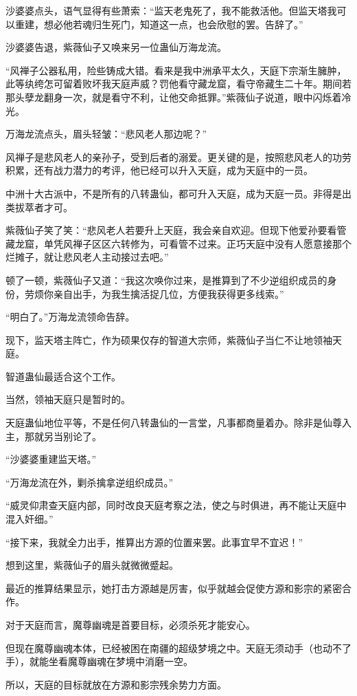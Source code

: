 \begin{this_body}
沙婆婆点头，语气显得有些萧索：“监天老鬼死了，我不能救活他。但监天塔我可以重建，想必他若魂归生死门，知道这一点，也会欣慰的罢。告辞了。”

沙婆婆告退，紫薇仙子又唤来另一位蛊仙万海龙流。

“风禅子公器私用，险些铸成大错。看来是我中洲承平太久，天庭下宗渐生臃肿，此等纨绔怎可留着败坏我天庭声威？罚他看守藏龙窟，看守帝藏生二十年。期间若那头孽龙翻身一次，就是看守不利，让他交命抵罪。”紫薇仙子说道，眼中闪烁着冷光。

万海龙流点头，眉头轻皱：“悲风老人那边呢？”

风禅子是悲风老人的亲孙子，受到后者的溺爱。更关键的是，按照悲风老人的功劳积累，还有战力潜力的考评，他已经可以升入天庭，成为天庭中的一员。

中洲十大古派中，不是所有的八转蛊仙，都可升入天庭，成为天庭一员。非得是出类拔萃者才可。

紫薇仙子笑了笑：“悲风老人若要升上天庭，我会亲自欢迎。但现下他爱孙要看管藏龙窟，单凭风禅子区区六转修为，可看管不过来。正巧天庭中没有人愿意接那个烂摊子，就让悲风老人主动接过去吧。”

顿了一顿，紫薇仙子又道：“我这次唤你过来，是推算到了不少逆组织成员的身份，劳烦你亲自出手，为我生擒活捉几位，方便我获得更多线索。”

“明白了。”万海龙流领命告辞。

现下，监天塔主阵亡，作为硕果仅存的智道大宗师，紫薇仙子当仁不让地领袖天庭。

智道蛊仙最适合这个工作。

当然，领袖天庭只是暂时的。

天庭蛊仙地位平等，不是任何八转蛊仙的一言堂，凡事都商量着办。除非是仙尊入主，那就另当别论了。

“沙婆婆重建监天塔。”

“万海龙流在外，剿杀擒拿逆组织成员。”

“威灵仰肃查天庭内部，同时改良天庭考察之法，使之与时俱进，再不能让天庭中混入奸细。”

“接下来，我就全力出手，推算出方源的位置来罢。此事宜早不宜迟！”

想到这里，紫薇仙子的眉头就微微蹙起。

最近的推算结果显示，她打击方源越是厉害，似乎就越会促使方源和影宗的紧密合作。

对于天庭而言，魔尊幽魂是首要目标，必须杀死才能安心。

但现在魔尊幽魂本体，已经被困在南疆的超级梦境之中。天庭无须动手（也动不了手），就能坐看魔尊幽魂在梦境中消磨一空。

所以，天庭的目标就放在方源和影宗残余势力方面。


\end{this_body}
